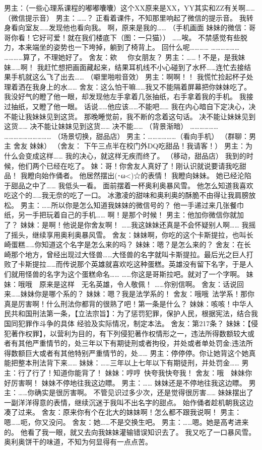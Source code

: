 \hypertarget{meisheyou}{}

男主：（一些心理系课程的嘟嘟囔囔）这个XX原来是XX，YY其实和ZZ有关啊……
（微信提示音）
男主：……？
正看着课件，不知那里响起了微信的提示音。
我转身看向室友……发现他也看向我。
啊，原来是我的……
（手机画面 妹妹的微信：哥哥你看！它好可爱！就在我们楼底下（图：一只猫））
……唉。
不禁感觉有些脱力，本来端坐的姿势也一下垮掉，躺到了椅背上。
回什么呢…………
………………
…………算了，不理她好了。
舍友：欸~~~你女朋友？
男主：……！不是，是我妹妹……啊！
我赶忙想把画面藏起来，结果耳机线不小心碰到了水杯……连忙去接结果手机就这么飞了出去……
（噼里啪啦音效）
男主：啊啊！！
我慌忙捡起杯子处理着洒在我身上的水……
舍友：这么怕干嘛……我又不能隔着屏幕把你妹妹吃了。
我没好气的瞪了他一眼，却发现他左手拿着几张抽纸，右手拿着我的手机。
我接过抽纸，又瞪了他一眼。
话说……他应该……不能吧……
我在内心暗自下定决心，决不能让我妹妹见到这货。
那晚睡觉前，我不断的念着这句话。
决不能让妹妹见到这货……
决不能让妹妹见到这货……
决不能……
（背景渐暗）
………………
…………………………
（场景切换，甜品店）
男主：………………（看向手机）
（群聊：男主 舍友 妹妹）
（舍友： 下午三点半在校门外DQ吃甜品！我请客！）
男主：为什么会变成这样……
我的决心，就这样无疾而终了。
（移动，甜品店）
我到的时候，他们两个已经在吃了。
妹：哥！你舍友人真好了！刚认识就说要请我吃甜品！
我瞪向始作俑者。
他居然摆出(･ω<)☆的表情！
我瞪向妹妹。
她已经沦陷于甜品之中了……
我低头一看。
面前摆着一杯奥利奥暴风雪。
他怎么知道我喜欢吃这个的……我无奈的吃了一口。
冰激凌的甜味和奥利奥的酥脆不由得让我肩膀放松。
男主：……所以你是怎么知道我妹妹的微信号的？
他一手递过来几张餐巾纸，另一手把玩着自己的手机……
啊！是那个时候！
男主：他加你微信你就加了？
妹妹：是啊！他说是你舍友啊！
……我这妹妹还真是不会怀疑别人啊……
我摇了摇头，继续享用奥利奥暴风雪。
舍友：妹妹啊，你吃的这个卡斯提拉，也叫长崎蛋糕……你知道这个名字是怎么来的吗？
妹妹：嗯？是怎么来的？
舍友：在长崎那个地方，曾经出现过大怪兽……大怪兽的名字就叫卡斯提拉。最后光之巨人打败了卡斯提拉……而传说那个英雄就喜欢吃这种蛋糕。英雄没有留下名字，于是人们就用怪兽的名字为这个蛋糕命名……
……你这是哥斯拉吧。就对了一个字啊。
妹妹：哦哦~~原来是这样~~无名英雄，令人敬佩！
……你别信啊。
舍友：话说回来……妹妹你是哪个系的？
妹妹：嗯？我是法学系的！
舍友：哦哦~法学系！那你真是厉害啊！什么刑法你都背的很熟了吧！第一条是什么？
妹妹：咳咳！中华人民共和国刑法第一条，【立法宗旨】：为了惩罚犯罪，保护人民，根据宪法，结合我国同犯罪作斗争的具体 经验及实际情况，制定本法。
舍友：第217条？
妹妹：【侵犯著作权罪】，以营利为目的，有下列侵犯著作权情形之一，违法所得数额较大或者有其他严重情节的，处三年以下有期徒刑或者拘役，并处或者单处罚金;违法所得数额巨大或者有其他特别严重情节的，处……
男主：停停停。你让她背这个她真能把整本刑法背下来……
妹妹：……三年以上七年以下有期徒刑，并处罚金……
男主：行了行了！知道你能背了！
妹妹：哼哼~快夸我快夸我！
舍友：哦~~妹妹你好厉害啊！
妹妹不停地往我这边瞟。
男主：……
妹妹还是不停地往我这边瞟。
男主：……你确实是很厉害啊。
不管见识过多少次，还是觉得很厉害……
妹妹摆出了一副洋洋得意的表情，继续沉迷于我叫不出名字的甜点。
始作俑者趁机朝我这边凑了过来。
舍友：原来你有个在北大的妹妹啊！怎么都不跟我说啊！
男主：嗯……呃，你又没问。
舍友：她……不是交换生吧。
男主：……嗯。她是高考进来的。
他看了我一眼，就又去向我妹妹灌输错误知识去了。
我又吃了一口暴风雪。
奥利奥饼干的味道，不知为何显得有一点点苦。
